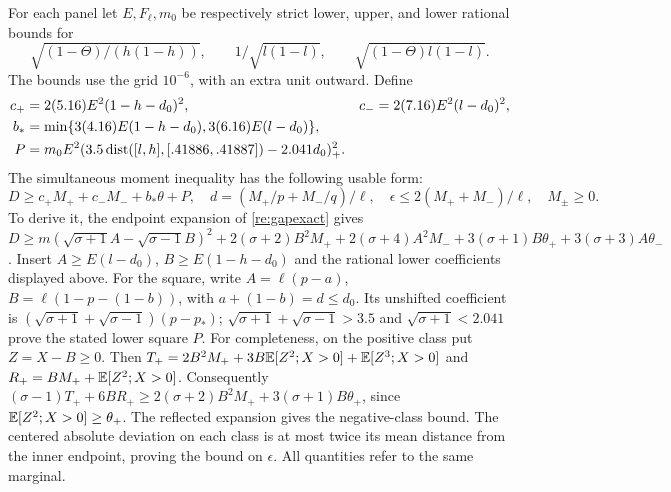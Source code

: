 For each panel let $E,F_\ell,m_0$ be respectively strict lower, upper,
and lower rational bounds for
\[
 \sqrt{(1-\Theta)/(h(1-h))},\qquad
 1/\sqrt{l(1-l)},\qquad \sqrt{(1-\Theta)l(1-l)}.
\]
The bounds use the grid $10^{-6}$, with an extra unit outward. Define
\begin{align*}
 c_+&=2(5.16)E^2(1-h-d_0)^2,&
 c_-&=2(7.16)E^2(l-d_0)^2,\\
 b_*&=\min\{3(4.16)E(1-h-d_0),3(6.16)E(l-d_0)\},\\
 P&=m_0E^2(3.5\operatorname{dist}([l,h],[.41886,.41887])-2.041d_0)_+^2.
\end{align*}
The simultaneous moment inequality has the following usable form:
\begin{equation}\label{conf:moment}
 D\ge c_+M_++c_-M_-+b_*\theta+P,\quad
 d=(M_+/p+M_-/q)/\ell,\quad
 \epsilon\le2(M_++M_-)/\ell,\quad M_\pm\ge0.
\end{equation}
To derive it, the endpoint expansion of \eqref{re:gapexact} gives
$D\ge m(\sqrt{\sigma+1}A-\sqrt{\sigma-1}B)^2
+2(\sigma+2)B^2M_++2(\sigma+4)A^2M_-
+3(\sigma+1)B\theta_++3(\sigma+3)A\theta_-$.
Insert $A\ge E(l-d_0)$, $B\ge E(1-h-d_0)$ and the rational lower
coefficients displayed above. For the square, write
$A=\ell(p-a)$, $B=\ell(1-p-(1-b))$, with
$a+(1-b)=d\le d_0$. Its unshifted coefficient is
$(\sqrt{\sigma+1}+\sqrt{\sigma-1})(p-p_*)$;
$\sqrt{\sigma+1}+\sqrt{\sigma-1}>3.5$ and
$\sqrt{\sigma+1}<2.041$ prove the stated lower square $P$.
For completeness, on the positive class put $Z=X-B\ge0$.
Then $T_+=2B^2M_++3B\mathbb E[Z^2;X>0]+\mathbb E[Z^3;X>0]$ and
$R_+=BM_++\mathbb E[Z^2;X>0]$. Consequently
$(\sigma-1)T_++6BR_+\ge2(\sigma+2)B^2M_+
+3(\sigma+1)B\theta_+$, since $\mathbb E[Z^2;X>0]\ge\theta_+$.
The reflected expansion gives the negative-class bound.
The centered absolute deviation on each class is at most twice its
mean distance from the inner endpoint, proving the bound on $\epsilon$.
All quantities refer to the same marginal.

